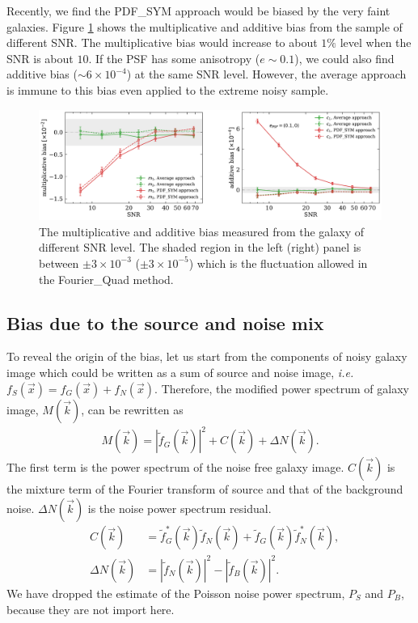 \documentclass[twocolumn]{aastex62}
\def\ie{{\it i.e. }}
\begin{document}
Recently, we find the PDF\_SYM approach would be biased by the very faint galaxies. Figure \ref{fig:pts_mc} shows the multiplicative and additive bias from the sample of different SNR. The multiplicative bias would increase to about $1\%$ level when the SNR is about $10$. If the PSF has some anisotropy ($e \sim 0.1$), we could also find additive bias ($\sim 6\times 10^{-4}$) at the same SNR level. However, the average approach is immune to this bias even applied to the extreme noisy sample. 




\begin{figure}[htbp]
	\centering
	\includegraphics[width=0.9\linewidth]{figures/pts_sample_mc.pdf}
	\caption{The multiplicative and additive bias measured from the galaxy of different SNR level. The shaded region in the left (right) panel is between $\pm 3\times 10^{-3}$ ($\pm 3\times10^{-5}$) which is the fluctuation allowed in the Fourier\_Quad method. }\label{fig:pts_mc}
\end{figure}


\subsection{Bias due to the source and noise mix}\label{sec:bias_cal}
To reveal the origin of the bias, let us start from the components of noisy galaxy image which could be written as a sum of source and noise image, \ie$f_S(\vec{x}) = f_G(\vec{x}) + f_N(\vec{x})$. Therefore, the modified power spectrum of galaxy image, $M(\vec{k})$, can be rewritten as 
\begin{eqnarray}
M(\vec{k}) =  \left\vert\widetilde{f}_G(\vec{k})\right\vert^2+ C(\vec{k}) + \Delta N(\vec{k}).
\end{eqnarray}
The first term is the power spectrum of the noise free galaxy image. $C(\vec{k})$ is the mixture term of the Fourier transform of source and that of the background noise. $\Delta N(\vec{k})$ is the noise power spectrum residual. 
\begin{eqnarray}
& C(\vec{k})& = \widetilde{f}_{G}^{*}(\vec{k})\widetilde{f}_N(\vec{k}) + \widetilde{f}_{G}(\vec{k})\widetilde{f}_{N}^{*}(\vec{k}),\\ \nonumber
&\Delta N(\vec{k})& = \left\vert\widetilde{f}_N(\vec{k})\right\vert^2 -\left\vert\widetilde{f}_B(\vec{k})\right\vert^2.
\end{eqnarray}
We have dropped the estimate of the Poisson noise power spectrum, $P_S$ and $P_B$, because they are not import here. 
\end{document}
